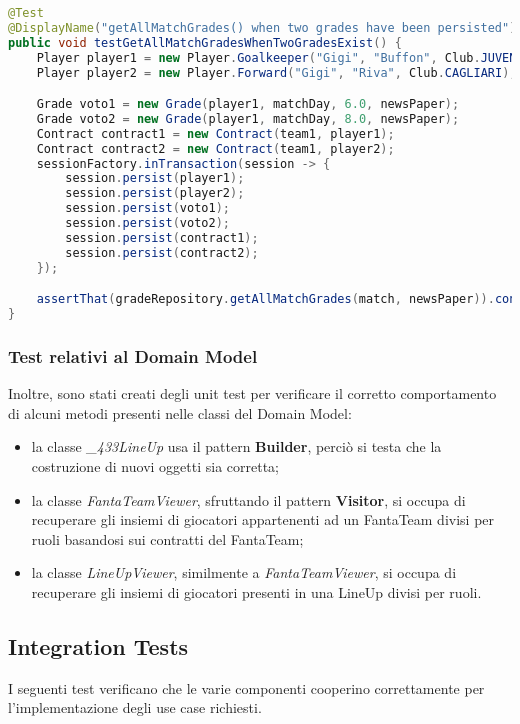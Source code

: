 \begin{lstlisting}[language=Java]
@Test
@DisplayName("getAllMatchGrades() when two grades have been persisted")
public void testGetAllMatchGradesWhenTwoGradesExist() {
	Player player1 = new Player.Goalkeeper("Gigi", "Buffon", Club.JUVENTUS);
	Player player2 = new Player.Forward("Gigi", "Riva", Club.CAGLIARI);

    Grade voto1 = new Grade(player1, matchDay, 6.0, newsPaper);
	Grade voto2 = new Grade(player1, matchDay, 8.0, newsPaper);
	Contract contract1 = new Contract(team1, player1);
	Contract contract2 = new Contract(team1, player2);
	sessionFactory.inTransaction(session -> {
		session.persist(player1);
		session.persist(player2);
		session.persist(voto1);
		session.persist(voto2);
		session.persist(contract1);
		session.persist(contract2);
	});

	assertThat(gradeRepository.getAllMatchGrades(match, newsPaper)).containsExactly(voto1, voto2);
}
\end{lstlisting}


\subsubsection{Test relativi al Domain Model}

Inoltre, sono stati creati degli unit test per verificare il corretto comportamento di alcuni metodi presenti nelle classi del Domain Model:
\begin{itemize}
    \item la classe \textit{\_433LineUp} usa il pattern \textbf{Builder}, perciò si testa che la costruzione di nuovi oggetti sia corretta;
    \item la classe \textit{FantaTeamViewer}, sfruttando il pattern \textbf{Visitor}, si occupa di recuperare gli 
        insiemi di giocatori appartenenti ad un FantaTeam divisi per ruoli basandosi sui contratti del FantaTeam;
    \item la classe \textit{LineUpViewer}, similmente a \textit{FantaTeamViewer}, si occupa di recuperare gli 
        insiemi di giocatori presenti in una LineUp divisi per ruoli.
\end{itemize}



\subsection{Integration Tests}

I seguenti test verificano che le varie componenti cooperino correttamente per l'implementazione degli use case richiesti.


